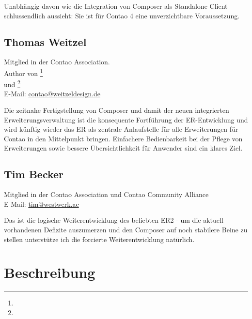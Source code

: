 \documentclass[
paper=a4,
draft=false,%
fontsize=10pt%
]{scrartcl}
\begin{document}
Unabhängig davon wie die Integration von Composer als Standalone-Client schlussendlich aussieht: Sie ist für Contao 4 eine unverzichtbare Voraussetzung.


\pagebreak

\subsection*{Thomas  Weitzel}

Mitglied in der Contao Association.\\
Author von \footnote{} \\
und \footnote{} \\
E-Mail: \href{mailto:contao@weitzeldesign.de}{contao@weitzeldesign.de}

Die zeitnahe Fertigstellung von Composer und damit der neuen integrierten Erweiterungsverwaltung ist die konsequente Fortführung der ER-Entwicklung und wird künftig wieder das ER als zentrale Anlaufstelle für alle Erweiterungen für Contao in den Mittelpunkt bringen. Einfachere Bedienbarkeit bei der Pflege von Erweiterungen sowie bessere Übersichtlichkeit für Anwender sind ein klares Ziel.

\subsection*{Tim  Becker}

Mitglied in der Contao Association und Contao Community Alliance \\
E-Mail: \href{mailto:tim@westwerk.ac}{tim@westwerk.ac}

Das  ist die logische Weiterentwicklung des beliebten ER2 - um die aktuell vorhandenen Defizite auszumerzen und den Composer auf noch stabilere Beine zu stellen unterstütze ich die forcierte Weiterentwicklung natürlich.

\newpage

%
%

\section{Beschreibung}
\label{sec:description}
\end{document}
